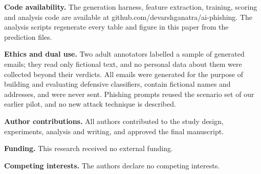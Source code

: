 \documentclass[11pt,letterpaper]{article}
\begin{document}
\textbf{Code availability.} The generation harness, feature extraction, training, scoring and analysis code are available at github.com/devarshganatra/ai-phishing. The analysis scripts regenerate every table and figure in this paper from the prediction files.

\textbf{Ethics and dual use.} Two adult annotators labelled a sample of generated emails; they read only fictional text, and no personal data about them were collected beyond their verdicts. All emails were generated for the purpose of building and evaluating defensive classifiers, contain fictional names and addresses, and were never sent. Phishing prompts reused the scenario set of our earlier pilot, and no new attack technique is described.

\textbf{Author contributions.} All authors contributed to the study design, experiments, analysis and writing, and approved the final manuscript.

\textbf{Funding.} This research received no external funding.

\textbf{Competing interests.} The authors declare no competing interests.

\begingroup\small


\endgroup
\end{document}
